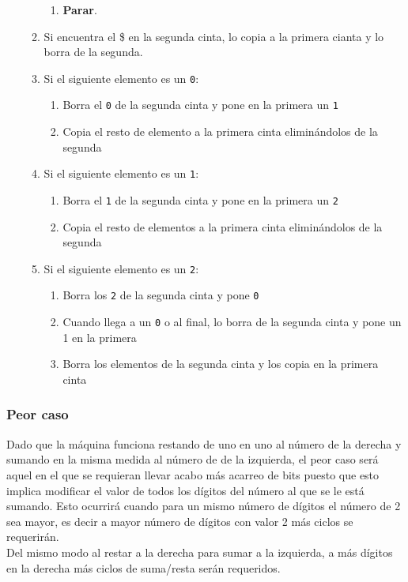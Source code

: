 \begin{itemize}
\begin{enumerate}
\begin{enumerate}[1.]
            \item \textbf{Parar}.
        \end{enumerate}
        \item Si encuentra el \$ en la segunda cinta, lo copia a la primera cianta y lo borra de la segunda.
        \item Si el siguiente elemento es un \texttt{0}:
        \begin{enumerate}[1.]
            \item Borra el \texttt{0} de la segunda cinta y pone en la primera un \texttt{1}
            \item Copia el resto de elemento a la primera cinta eliminándolos de la segunda
        \end{enumerate}
        \item Si el siguiente elemento es un \texttt{1}:
        \begin{enumerate}[1.]
            \item Borra el \texttt{1} de la segunda cinta y pone en la primera un \texttt{2}
            \item Copia el resto de elementos a la primera cinta eliminándolos de la segunda
        \end{enumerate}
        \item Si el siguiente elemento es un \texttt{2}:
        \begin{enumerate}[1.]
            \item Borra los \texttt{2} de la segunda cinta y pone \texttt{0}
            \item Cuando llega a un \texttt{0} o al final, lo borra de la segunda cinta y pone un 1 en la primera
            \item Borra los elementos de la segunda cinta y los copia en la primera cinta
        \end{enumerate}
    \end{enumerate}
\end{itemize}




\subsubsection*{Peor caso}
Dado que la máquina funciona restando de uno en uno al número de la derecha y sumando en la misma medida al número de de la izquierda, el peor caso será aquel en el que se requieran llevar acabo más acarreo de bits puesto que esto implica modificar el valor de todos los dígitos del número al que se le está sumando. Esto ocurrirá cuando para un mismo número de dígitos el número de 2 sea mayor, es decir a mayor número de dígitos con valor 2 más ciclos se requerirán.\\
Del mismo modo al restar a la derecha para sumar a la izquierda, a más dígitos en la derecha más ciclos de suma/resta serán requeridos.



